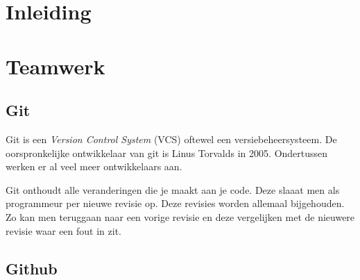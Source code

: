 \section{Inleiding}

\section{Teamwerk}
\subsection{Git}
Git is een \textit{Version Control System} (VCS) oftewel een versiebeheersysteem. De oorspronkelijke ontwikkelaar van git is Linus Torvalds in 2005.\cite{init_git} Ondertussen werken er al veel meer ontwikkelaars aan. 

Git onthoudt alle veranderingen die je maakt aan je code. Deze slaaat men als programmeur per nieuwe revisie op. Deze revisies worden allemaal bijgehouden. Zo kan men teruggaan naar een vorige revisie en deze vergelijken met de nieuwere revisie waar een fout in zit.
\subsection{Github}
